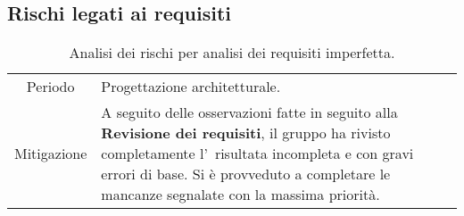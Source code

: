 \subsection{Rischi legati ai requisiti}
\begin{table}[H]
	\centering
	\begin{tabular}{|c|p{11.5cm}|}
		\rowcolor{darkblue} \hline
		\multicolumn{2}{|c|}{\textcolor{white}{\textbf{RR1 - Analisi dei requisiti imperfetta}}}\\ \hline
		Periodo & Progettazione architetturale.\\ \hline
		Mitigazione & A seguito delle osservazioni fatte in seguito alla \textbf{Revisione dei requisiti}, il gruppo {\Gruppo} ha rivisto completamente l'\AdR\ risultata incompleta e con gravi errori di base. Si è provveduto a completare le mancanze segnalate con la massima priorità.\\ \hline
	\end{tabular}
	\caption{\label{tab:ARR1}Analisi dei rischi per analisi dei requisiti imperfetta.}
\end{table}